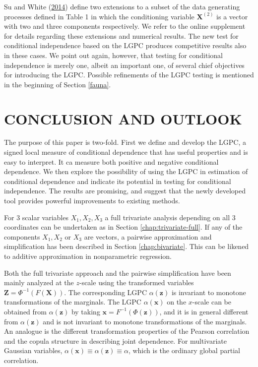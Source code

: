 \documentclass[
  12pt,
  letterpaper]{article}
\newcommand{\X}{\bm{X}}
\newcommand{\Xtwo}{\bm{X}^{(2)}}
\newcommand{\x}{\bm{x}}
\newcommand{\Z}{\bm{Z}}
\newcommand{\z}{\bm{z}}
\theoremstyle{definition}
\theoremstyle{definition}
\theoremstyle{definition}
\theoremstyle{remark}
\begin{document}
Su and White (\protect\hyperlink{ref-su2014testing}{2014}) define two extensions to a subset of the data generating processes defined in Table 1 in which the conditioning variable \(\Xtwo\) is a vector with two and three components respectively. We refer to the online supplement for details regarding these extensions and numerical results. The new test for conditional independence based on the LGPC produces competitive results also in these cases. We point out again, however, that testing for conditional independence is merely one, albeit an important one, of several chief objectives for introducing the LGPC. Possible refinements of the LGPC testing is mentioned in the beginning of Section \ref{fauna}.

\hypertarget{conclusion-and-outlook}{%
\section{CONCLUSION AND OUTLOOK}\label{conclusion-and-outlook}}

The purpose of this paper is two-fold. First we define and develop the LGPC, a signed local measure of conditional dependence that has useful properties and is easy to interpret. It ca measure both positive and negative conditional dependence. We then explore the possibility of using the LGPC in estimation of conditional dependence and indicate its potential in testing for conditional independence. The results are promising, and suggest that the newly developed tool provides powerful improvements to existing methods.

For 3 scalar variables \(X_1, X_2, X_3\) a full trivariate analysis depending on all 3 coordinates can be undertaken as in Section \ref{chap:trivariate-full}. If any of the components \(X_1, X_2\) or \(X_3\) are vectors, a pairwise approximation and simplification has been described in Section \ref{chap:bivariate}. This can be likened to additive approximation in nonparametric regression.

Both the full trivariate approach and the pairwise simplification have been mainly analyzed at the \(z\)-scale using the transformed variables \(\Z = \Phi^{-1}(F(\X))\). The corresponding LGPC \(\alpha(\z)\) is invariant to monotone transformations of the marginals. The LGPC \(\alpha(\x)\) on the \(x\)-scale can be obtained from \(\alpha(\z)\) by taking \(\x = F^{-1}(\Phi(\z))\), and it is in general different from \(\alpha(\z)\) and is not invariant to monotone transformations of the marginals. An analogue is the different transformation properties of the Pearson correlation and the copula structure in describing joint dependence. For multivariate Gaussian variables, \(\alpha(\x) \equiv \alpha(\z) \equiv \alpha\), which is the ordinary global partial correlation.
\end{document}

